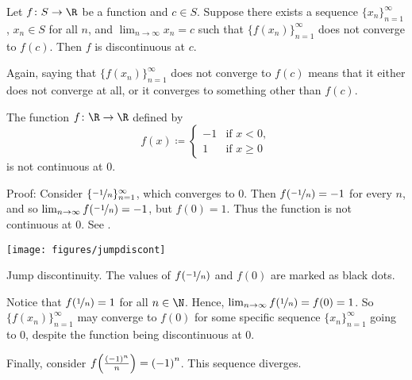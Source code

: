 \begin{prop}
Let $f \colon S \to \R$ be a function and $c \in S$.  Suppose 
there exists a sequence $\{ x_n \}_{n=1}^\infty$, $x_n \in S$ for all $n$,
and $\lim_{n\to\infty} x_n = c$
such that $\bigl\{ f(x_n) \bigr\}_{n=1}^\infty$
does not converge to $f(c)$.
Then $f$ is discontinuous at $c$.
\end{prop}

Again, 
saying that 
$\bigl\{ f(x_n) \bigr\}_{n=1}^\infty$ does not converge to $f(c)$
means that it
either does not converge
at all, or it converges to something
other than $f(c)$.

\begin{example} \label{example:jumpdiscont}
The function $f \colon \R \to \R$ defined by
\begin{equation*}
f(x) \coloneqq 
\begin{cases}
-1 & \text{if } x < 0, \\
1 & \text{if } x \geq 0
\end{cases}
\end{equation*}
is not continuous at 0.

Proof: Consider $\{ \nicefrac{-1}{n} \}_{n=1}^\infty$, which converges to 0.  Then
$f(\nicefrac{-1}{n}) = -1$ for every $n$,
and so
$\lim_{n\to\infty} f(\nicefrac{-1}{n}) = -1$, but $f(0) = 1$.  Thus the function is
not continuous at 0.  See
.

\begin{myfigureht}
\texttt{[image: figures/jumpdiscont]}
\caption{Jump discontinuity.  The values of
$f(\nicefrac{-1}{n})$ and $f(0)$ are marked as black dots.\label{fig:jumpdiscont}}
\end{myfigureht}

Notice that $f(\nicefrac{1}{n}) = 1$ for all $n \in \N$.
Hence, $\lim_{n\to\infty} f(\nicefrac{1}{n}) = f(0) = 1$.  So
$\bigl\{ f(x_n) \bigr\}_{n=1}^\infty$ may converge to $f(0)$
for some specific
sequence $\{ x_n \}_{n=1}^\infty$ going to 0,
despite the function being discontinuous at 0.

Finally, consider $f\Bigl(\frac{{(-1)}^n}{n}\Bigr) = {(-1)}^n$.
This sequence diverges.
\end{example}

